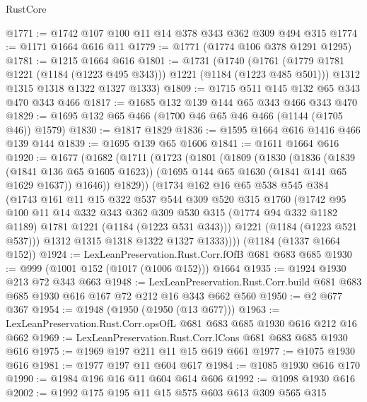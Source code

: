 \begin{lexlean}{RustCore}
\begin{coremodule}
@1771 := @1742 @107 @100 @11 @14 @378 @343 @362 @309 @494 @315
@1774 := @1171 @1664 @616 @11
@1779 := @1771 (@1774 @106 @378 @1291 @1295)
@1781 := @1215 @1664 @616
@1801 := @1731
    (@1740
      (@1761 (@1779 @1781 @1221 (@1184 (@1223 @495 @343))) @1221 (@1184 (@1223 @485 @501)))
      @1312
      @1315
      @1318
      @1322
      @1327
      @1333)
@1809 := @1715 @511 @145 @132 @65 @343 @470 @343 @466
@1817 := @1685 @132 @139 @144 @65 @343 @466 @343 @470
@1829 := @1695 @132 @65 @466 (@1700 @46 @65 @46 @466 (@1144 (@1705 @46)) @1579)
@1830 := @1817 @1829
@1836 := @1595 @1664 @616 @1416 @466 @139 @144
@1839 := @1695 @139 @65 @1606
@1841 := @1611 @1664 @616
@1920 := @1677
    (@1682
      (@1711
        (@1723
          (@1801
            (@1809
              (@1830
                (@1836
                  (@1839 (@1841 @136 @65 @1605 @1623))
                  (@1695 @144 @65 @1630 (@1841 @141 @65 @1629 @1637))
                  @1646))
              @1829))
          (@1734
            @162
            @16
            @65
            @538
            @545
            @384
            (@1743
              @161
              @11
              @15
              @322
              @537
              @544
              @309
              @520
              @315
              @1760
              (@1742
                @95
                @100
                @11
                @14
                @332
                @343
                @362
                @309
                @530
                @315
                (@1774 @94 @332 @1182 @1189)
                @1781
                @1221
                (@1184 (@1223 @531 @343)))
              @1221
              (@1184 (@1223 @521 @537)))
            @1312
            @1315
            @1318
            @1322
            @1327
            @1333))))
    (@1184 (@1337 @1664 @152))
@1924 := LexLeanPreservation.Rust.Corr.fOfB @681 @683 @685
@1930 := @999 (@1001 @152 (@1017 (@1006 @152))) @1664
@1935 := @1924 @1930 @213 @72 @343 @663
@1948 := LexLeanPreservation.Rust.Corr.build
    @681
    @683
    @685
    @1930
    @616
    @167
    @72
    @212
    @16
    @343
    @662
    @560
@1950 := @2 @677 @367
@1954 := @1948 (@1950 (@1950 (@13 @677)))
@1963 := LexLeanPreservation.Rust.Corr.opsOfL @681 @683 @685 @1930 @616 @212 @16 @662
@1969 := LexLeanPreservation.Rust.Corr.lCons @681 @683 @685 @1930 @616
@1975 := @1969 @197 @211 @11 @15 @619 @661
@1977 := @1075 @1930 @616
@1981 := @1977 @197 @11 @604 @617
@1984 := @1085 @1930 @616 @170
@1990 := @1984 @196 @16 @11 @604 @614 @606
@1992 := @1098 @1930 @616
@2002 := @1992 @175 @195 @11 @15 @575 @603 @613 @309 @565 @315

\end{coremodule}
\end{lexlean}
